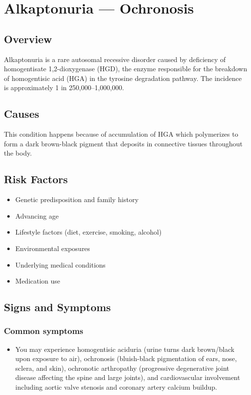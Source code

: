 \chapter{Alkaptonuria --- Ochronosis}
\label{sec:Alkaptonuria}

\section{Overview}
Alkaptonuria is a rare autosomal recessive disorder caused by deficiency of homogentisate 1,2-dioxygenase (HGD), the enzyme responsible for the breakdown of homogentisic acid (HGA) in the tyrosine degradation pathway. The incidence is approximately 1 in 250,000--1,000,000.
\section{Causes}
This condition happens because of accumulation of HGA which polymerizes to form a dark brown-black pigment that deposits in connective tissues throughout the body.     
\section{Risk Factors}

\begin{itemize}[noitemsep]
  \item Genetic predisposition and family history
  \item Advancing age
  \item Lifestyle factors (diet, exercise, smoking, alcohol)
  \item Environmental exposures
  \item Underlying medical conditions
  \item Medication use
\end{itemize}
\section{Signs and Symptoms}

\subsection{Common symptoms}
\begin{itemize}[noitemsep]
  \item You may experience homogentisic aciduria (urine turns dark brown/black upon exposure to air), ochronosis (bluish-black pigmentation of ears, nose, sclera, and skin), ochronotic arthropathy (progressive degenerative joint disease affecting the spine and large joints), and cardiovascular involvement including aortic valve stenosis and coronary artery calcium buildup. 
  \end{itemize}

